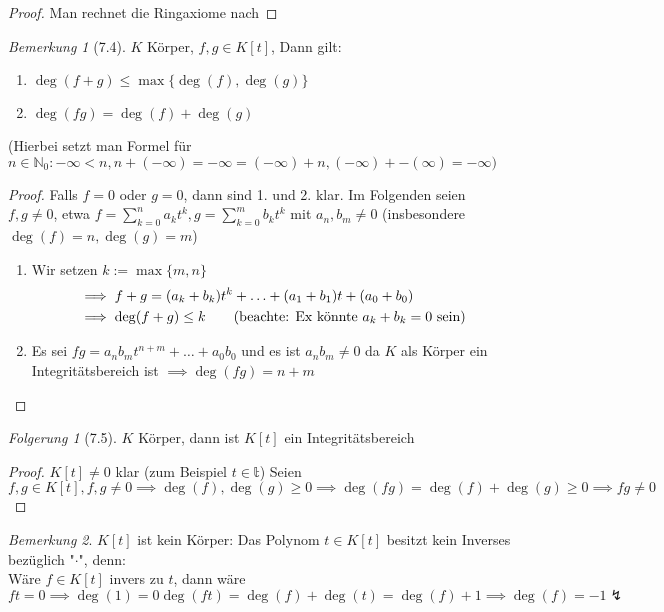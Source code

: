 \documentclass[a4paper]{scrartcl}
\theoremstyle{definition}
\theoremstyle{plain}
\theoremstyle{plain}
\theoremstyle{remark}
\newtheorem{remark}{Bemerkung}
\theoremstyle{remark}
\theoremstyle{remark}
\newtheorem{conc}{Folgerung}
\theoremstyle{remark}
\theoremstyle{remark}
\begin{document}
\begin{proof}
Man rechnet die Ringaxiome nach
\end{proof}
\begin{remark}[7.4]
\label{remark:74}
$K$ Körper, $f,g\in K[t]$, Dann gilt:
\begin{enumerate}
\item $\deg(f + g) \leq \max\{\deg(f),\deg(g)\}$
\item $\deg(f g) = \deg(f) + \deg(g)$
\end{enumerate}
(Hierbei setzt man Formel für $n\in\mathbb{N}_0: -\infty < n, n + (-\infty) = -\infty = (-\infty) + n, (-\infty) + -(\infty) = -\infty)$
\end{remark}
\begin{proof}
Falls $f = 0$ oder $g = 0$, dann sind 1. und 2. klar. Im Folgenden seien $f,g\neq 0$, etwa $f = \sum_{k = 0}^n a_k t^k, g = \sum_{k =0}^m b_k t^k$ mit $a_n, b_m \neq 0$ (insbesondere $\deg(f) = n, \deg(g) = m$)
\begin{enumerate}
\item Wir setzen $k:= \max\{m,n\}$
\begin{align*}
&\implies f + g = (a_k + b_k)t^k + \ldots + (a_1 + b_1)t + (a_0 + b_0) \\
&\implies \deg(f + g) \leq k \tag{\text{beachte: Ex könnte $a_k + b_k = 0$ sein}}
\end{align*}
\item Es sei $f g = a_n b_m t^{n + m} + \ldots + a_0 b_0$ und es ist $a_n b_m \neq 0$ da $K$ als Körper ein Integritätsbereich ist $\implies \deg(f g) = n + m$
\end{enumerate}
\end{proof}
\begin{conc}[7.5]
$K$ Körper, dann ist $K[t]$ ein Integritätsbereich
\end{conc}
\begin{proof}
$K[t] \neq 0$ klar (zum Beispiel $t\in\mathbb{t}$)
Seien $f,g\in K[t], f,g\neq 0 \implies \deg(f),\deg(g) \geq 0 \implies \deg(f g) = \deg(f) + \deg(g) \geq 0 \implies f g \neq 0$
\end{proof}
\begin{remark}
$K[t]$ ist kein Körper: Das Polynom $t\in K[t]$ besitzt kein Inverses bezüglich "$\cdot$", denn: \\
  Wäre $f\in K[t]$ invers zu $t$, dann wäre $f t = 0 \implies \deg(1) = 0 \deg(f t) = \deg(f) + \deg(t) = \deg (f) + 1 \implies \deg(f) = -1 \lightning$
\end{remark}
\end{document}
